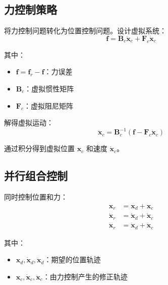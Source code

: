 \documentclass[12pt,a4paper]{article}
\begin{document}
\subsection{力控制策略}

将力控制问题转化为位置控制问题。设计虚拟系统：
\begin{equation}
\mathbf{f} = \mathbf{B}_c\ddot{\mathbf{x}}_c + \mathbf{F}_c\dot{\mathbf{x}}_c
\label{eq:virtual_system}
\end{equation}

其中：
\begin{itemize}
    \item $\mathbf{f} = \mathbf{f}_r - \mathbf{f}$：力误差
    \item $\mathbf{B}_c$：虚拟惯性矩阵
    \item $\mathbf{F}_c$：虚拟阻尼矩阵
\end{itemize}

解得虚拟运动：
\begin{equation}
\ddot{\mathbf{x}}_c = \mathbf{B}_c^{-1}(\mathbf{f} - \mathbf{F}_c\dot{\mathbf{x}}_c)
\label{eq:virtual_motion}
\end{equation}

通过积分得到虚拟位置 $\mathbf{x}_c$ 和速度 $\dot{\mathbf{x}}_c$。

\subsection{并行组合控制}

同时控制位置和力：
\begin{align}
\mathbf{x}_r &= \mathbf{x}_d + \mathbf{x}_c \\
\dot{\mathbf{x}}_r &= \dot{\mathbf{x}}_d + \dot{\mathbf{x}}_c \\
\ddot{\mathbf{x}}_r &= \ddot{\mathbf{x}}_d + \ddot{\mathbf{x}}_c
\end{align}

其中：
\begin{itemize}
    \item $\mathbf{x}_d, \dot{\mathbf{x}}_d, \ddot{\mathbf{x}}_d$：期望的位置轨迹
    \item $\mathbf{x}_c, \dot{\mathbf{x}}_c, \ddot{\mathbf{x}}_c$：由力控制产生的修正轨迹
\end{itemize}
\end{document}
